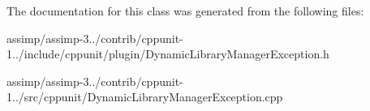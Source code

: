 The documentation for this class was generated from the following files\+:\begin{DoxyCompactItemize}
\item 
assimp/assimp-\/3../contrib/cppunit-\/1../include/cppunit/plugin/Dynamic\+Library\+Manager\+Exception.\+h\item 
assimp/assimp-\/3../contrib/cppunit-\/1../src/cppunit/Dynamic\+Library\+Manager\+Exception.\+cpp\end{DoxyCompactItemize}
